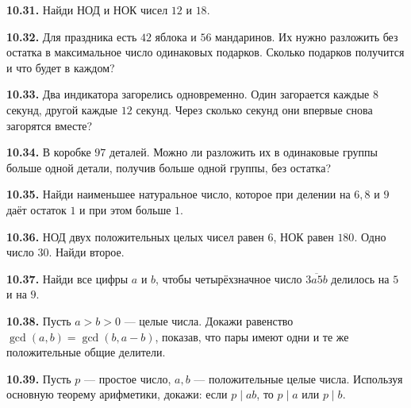 \noindent\begin{minipage}[t]{\linewidth}\textbf{10.31.} Найди НОД и НОК чисел \(12\) и \(18\).\par\end{minipage}\par
\noindent\begin{minipage}[t]{\linewidth}\textbf{10.32.} Для праздника есть \(42\) яблока и \(56\) мандаринов. Их нужно разложить без остатка в максимальное число одинаковых подарков. Сколько подарков получится и что будет в каждом?\par\end{minipage}\par
\noindent\begin{minipage}[t]{\linewidth}\textbf{10.33.} Два индикатора загорелись одновременно. Один загорается каждые \(8\) секунд, другой каждые \(12\) секунд. Через сколько секунд они впервые снова загорятся вместе?\par\end{minipage}\par
\noindent\begin{minipage}[t]{\linewidth}\textbf{10.34.} В коробке \(97\) деталей. Можно ли разложить их в одинаковые группы больше одной детали, получив больше одной группы, без остатка?\par\end{minipage}\par
\noindent\begin{minipage}[t]{\linewidth}\textbf{10.35.}\starmark{} Найди наименьшее натуральное число, которое при делении на \(6,\allowbreak 8\) и \(9\) даёт остаток \(1\) и при этом больше \(1\).\par\end{minipage}\par
\noindent\begin{minipage}[t]{\linewidth}\textbf{10.36.}\starmark{} НОД двух положительных целых чисел равен \(6\), НОК равен \(180\). Одно число \(30\). Найди второе.\par\end{minipage}\par
\noindent\begin{minipage}[t]{\linewidth}\textbf{10.37.}\starmark{} Найди все цифры \(a\) и \(b\), чтобы четырёхзначное число \(\overline{3a5b}\) делилось на \(5\) и на \(9\).\par\end{minipage}\par
\noindent\begin{minipage}[t]{\linewidth}\textbf{10.38.} Пусть \(a>b>0\) --- целые числа. Докажи равенство \(\gcd(a,b)=\gcd(b,a-b)\), показав, что пары имеют одни и те же положительные общие делители.\par\end{minipage}\par
\noindent\begin{minipage}[t]{\linewidth}\textbf{10.39.} Пусть \(p\) --- простое число, \(a,b\) --- положительные целые числа. Используя основную теорему арифметики, докажи: если \(p\mid ab\), то \(p\mid a\) или \(p\mid b\).\par\end{minipage}\par
\endgroup
